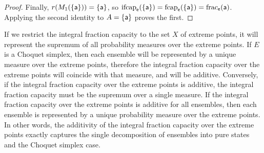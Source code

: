 \begin{mathSection}
\begin{proof}
	Finally, $r(M_1(\{\ens[a]\}))=\{\ens[a]\}$, so $\mathrm{ifcap}_{\ens}(\{\ens[a]\}) = \fcap_{\ens}(\{\ens[a]\}) = \fraction_{\ens}(\ens[a])$.	Applying the second identity to $A=\{\ens[a]\}$ proves the first.
\end{proof}
\end{mathSection}

If we restrict the integral fraction capacity to the set $X$ of extreme points, it will represent the supremum of all probability measures over the extreme points. If $E$ is a Choquet simplex, then each ensemble will be represented by a unique measure over the extreme points, therefore the integral fraction capacity over the extreme points will coincide with that measure, and will be additive. Conversely, if the integral fraction capacity over the extreme points is additive, the integral fraction capacity must be the supremum over a single measure. If the integral fraction capacity over the extreme points is additive for all ensembles, then each ensemble is represented by a unique probability measure over the extreme points. In other words, the additivity of the integral fraction capacity over the extreme points exactly captures the single decomposition of ensembles into pure states and the Choquet simplex case.

